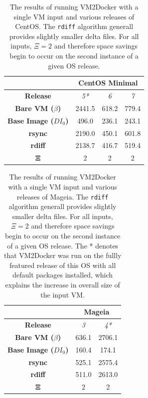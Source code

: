 \begin{table}[h]
\centering
    \begin{tabular}{| c | c | c | c |}
    \hline
& \multicolumn{3}{|c|}{\bfseries CentOS Minimal} \\ \hline
    \bfseries Release & \itshape 5* & \itshape 6 & \itshape 7 \\ \hline
    \bfseries Bare VM ($\beta$) & 2441.5 &  618.2 & 779.4\\ \hline
    \bfseries Base Image ($DI_0$) & 496.0 & 236.1 & 243.1\\ \hline
    \bfseries rsync & 2190.0 & 450.1 & 601.8\\ \hline 
    \bfseries rdiff & 2138.7 & 416.7 & 519.4\\ \hline
\bfseries $\boldsymbol{\Xi}$ & 2 & 2 & 2 \\ \hline
    \end{tabular}
\caption{The results of running VM2Docker with a single VM input and various releases of CentOS. The \texttt{rdiff} algorithm generall provides slightly smaller delta files. For all inputs, $\Xi = 2$ and therefore space savings begin to occur on the second instance of a given OS release.}
\label{table:diff2}
\end{table}

\begin{table}[h]
\centering
    \begin{tabular}{| c | c | c |}
    \hline
& \multicolumn{2}{|c|}{\bfseries Mageia} \\ \hline
    \bfseries Release & \itshape 3 & \itshape 4*  \\ \hline
    \bfseries Bare VM ($\beta$) & 636.1 & 2706.1 \\ \hline
    \bfseries Base Image ($DI_0$) & 160.4 & 174.1\\ \hline
    \bfseries rsync & 525.1 & 2575.4\\ \hline 
    \bfseries rdiff & 511.0 & 2613.0\\ \hline 
\bfseries $\boldsymbol{\Xi}$ & 2 & 2  \\ \hline
    \end{tabular}
\caption{The results of running VM2Docker with a single VM input and various releases of Mageia. The \texttt{rdiff} algorithm generall provides slightly smaller delta files. For all inputs, $\Xi = 2$ and therefore space savings begin to occur on the second instance of a given OS release. The * denotes that VM2Docker was run on the fullly featured release of this OS with all default packages installed, which explains the increase in overall size of the input VM.}
\label{table:diff3}
\end{table}

